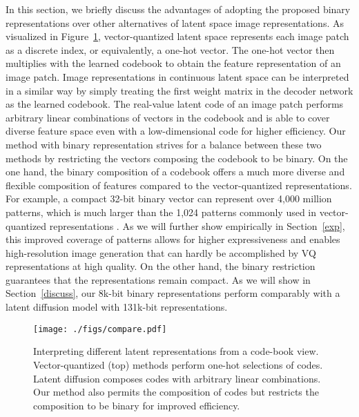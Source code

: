 \documentclass[10pt,twocolumn,letterpaper]{article}
\begin{document}
In this section, we briefly discuss the advantages of adopting the proposed binary representations over other alternatives of latent space image representations. 
As visualized in Figure~\ref{fig:compare}, vector-quantized latent space \cite{vqvae,vqgan} represents each image patch as a discrete index, or equivalently, a one-hot vector. The one-hot vector then multiplies with the learned codebook to obtain the feature representation of an image patch. 
Image representations in continuous latent space \cite{latent} can be interpreted in a similar way by simply treating the first weight matrix in the decoder network as the learned codebook.
The real-value latent code of an image patch performs arbitrary linear combinations of vectors in the codebook and is able to cover diverse feature space even with a low-dimensional code for higher efficiency. 
Our method with binary representation strives for a balance between these two methods by restricting the vectors composing the codebook to be binary. 
On the one hand, the binary composition of a codebook offers a much more diverse and flexible composition of features compared to the vector-quantized representations. For example, a compact 32-bit binary vector can represent over 4,000 million patterns, which is much larger than the 1,024 patterns commonly used in vector-quantized representations \cite{maskgit,unleashing,vae}. As we will further show empirically in Section~\ref{exp}, this improved coverage of patterns allows for higher expressiveness and enables high-resolution image generation that can hardly be accomplished by VQ representations at high quality.
On the other hand, the binary restriction guarantees that the representations remain compact. As we will show in Section~\ref{discuss}, our 8k-bit binary representations perform comparably with a latent diffusion model \cite{latent} with 131k-bit representations. 

\begin{figure}[t]
    \centering
	\texttt{[image: ./figs/compare.pdf]}
\caption{Interpreting different latent representations from a code-book view. Vector-quantized (top) methods perform one-hot selections of codes. Latent diffusion composes codes with arbitrary linear combinations. Our method also permits the composition of codes but restricts the composition to be binary for improved efficiency. }
\label{fig:compare}
\end{figure}
\end{document}
